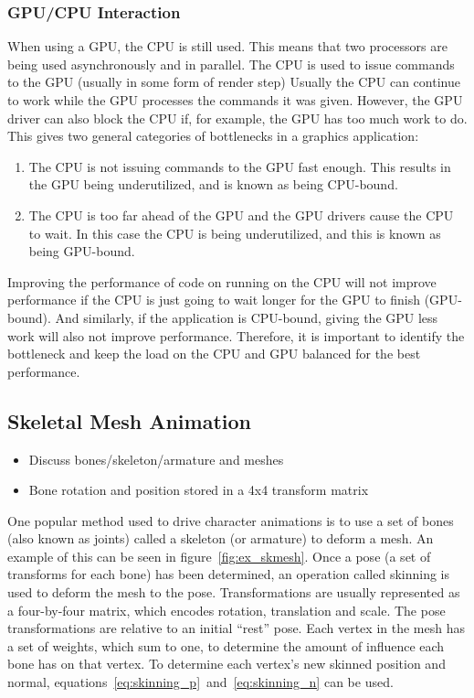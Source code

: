 \subsubsection{GPU/CPU Interaction}
When using a GPU, the CPU is still used.
This means that two processors are being used asynchronously and in parallel.
The CPU is used to issue commands to the GPU (usually in some form of render step)
Usually the CPU can continue to work while the GPU processes the commands it was given.
However, the GPU driver can also block the CPU if, for example, the GPU has too much work to do.
This gives two general categories of bottlenecks in a graphics application:
\begin{enumerate}
 \item The CPU is not issuing commands to the GPU fast enough. This results in the GPU being underutilized, and is known as being CPU-bound.
 \item The CPU is too far ahead of the GPU and the GPU drivers cause the CPU to wait. In this case the CPU is being underutilized, and this is known as being GPU-bound.
\end{enumerate}
Improving the performance of code on running on the CPU will not improve performance if the CPU is just going to wait longer for the GPU to finish (GPU-bound).
And similarly, if the application is CPU-bound, giving the GPU less work will also not improve performance.
Therefore, it is important to identify the bottleneck and keep the load on the CPU and GPU balanced for the best performance.

\subsection{Skeletal Mesh Animation}
\ifsummaries
\begin{itemize}
 \item Discuss bones/skeleton/armature and meshes
 \item Bone rotation and position stored in a 4x4 transform matrix
\end{itemize}
\fi

One popular method used to drive character animations is to use a set of bones (also known as joints) called a skeleton (or armature) to deform a mesh.
An example of this can be seen in figure~\ref{fig:ex_skmesh}.
Once a pose (a set of transforms for each bone) has been determined, an operation called skinning is used to deform the mesh to the pose.
Transformations are usually represented as a four-by-four matrix, which encodes rotation, translation and scale.
The pose transformations are relative to an initial ``rest'' pose.
Each vertex in the mesh has a set of weights, which sum to one, to determine the amount of influence each bone has on that vertex.
To determine each vertex's new skinned position and normal, equations~\ref{eq:skinning_p}~and~\ref{eq:skinning_n} can be used.

